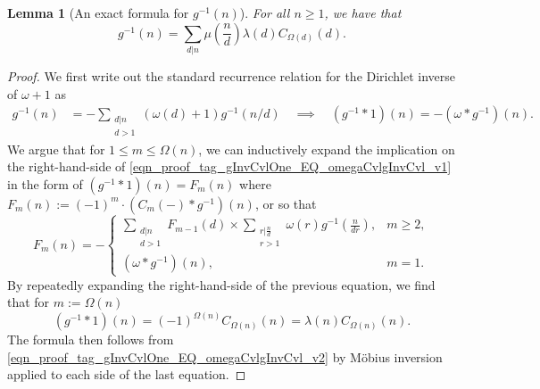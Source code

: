 \documentclass[11pt,reqno,a4letter]{article}
\numberwithin{figure}{section}
\numberwithin{table}{section}
\theoremstyle{plain}
\newtheorem{lemma}[theorem]{Lemma}
\numberwithin{theorem}{section}
\theoremstyle{definition}
\begin{document}
\begin{lemma}[An exact formula for $g^{-1}(n)$] 
\label{lemma_AnExactFormulaFor_gInvByMobiusInv_v1} 
For all $n \geq 1$, we have that 
\[
g^{-1}(n) = \sum_{d|n} \mu\left(\frac{n}{d}\right) \lambda(d) C_{\Omega(d)}(d). 
\]
\end{lemma}
\begin{proof} 
We first write out the standard recurrence relation for the Dirichlet inverse of 
$\omega+1$ as 
\begin{align} 
\label{eqn_proof_tag_gInvCvlOne_EQ_omegaCvlgInvCvl_v1} 
g^{-1}(n) & = - \sum_{\substack{d|n \\ d>1}} (\omega(d) + 1) g^{-1}(n/d) 
     \quad\implies\quad 
     (g^{-1} \ast 1)(n) = -(\omega \ast g^{-1})(n). 
\end{align} 
We argue that for $1 \leq m \leq \Omega(n)$, we can inductively expand the 
implication on the right-hand-side of \eqref{eqn_proof_tag_gInvCvlOne_EQ_omegaCvlgInvCvl_v1} 
in the form of $(g^{-1} \ast 1)(n) = F_m(n)$ where 
$F_m(n) := (-1)^{m} \cdot (C_m(-) \ast g^{-1})(n)$, or so that 
\[
F_m(n) = - 
     \begin{cases} 
     \sum\limits_{\substack{d|n \\ d > 1}} F_{m-1}(d) \times \sum\limits_{\substack{r|\frac{n}{d} \\ r > 1}} 
     \omega(r) g^{-1}\left(\frac{n}{dr}\right), & m \geq 2, \\ 
     (\omega \ast g^{-1})(n), & m = 1. 
     \end{cases} 
\]
By repeatedly expanding the right-hand-side of the previous equation, 
we find that for $m := \Omega(n)$ 
\begin{equation} 
\label{eqn_proof_tag_gInvCvlOne_EQ_omegaCvlgInvCvl_v2} 
(g^{-1} \ast 1)(n) = (-1)^{\Omega(n)} C_{\Omega(n)}(n) = \lambda(n) C_{\Omega(n)}(n). 
\end{equation} 
The formula then follows from \eqref{eqn_proof_tag_gInvCvlOne_EQ_omegaCvlgInvCvl_v2} 
by M\"obius inversion applied to each side of the last equation. 
\end{proof} 
\end{document}

